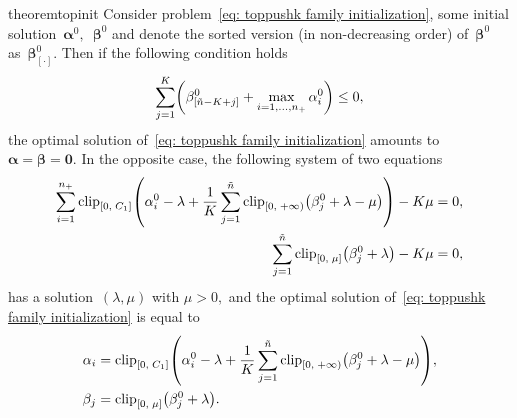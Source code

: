 \begin{restatable}{theorem}{topinit}\label{thm: toppushk family initialization}
  Consider problem~\eqref{eq: toppushk family initialization}, some initial solution~$\bm{\alpha}^0,$~$\bm{\beta}^0$ and denote the sorted version (in non-decreasing order) of~$\bm{\beta}^0$ as~$\bm{\beta}_{[\cdot]}^0.$ Then if the following condition holds
  \begin{equation}\label{eq:problem3_cond}
    \sum_{j = 1}^{K} \Brac{\beta_{[\ntil - K + j]}^0 + \max_{i = 1, \ldots, \npos} \alpha_i^0} \le 0,
  \end{equation}
  the optimal solution of~\eqref{eq: toppushk family initialization} amounts to~$\bm{\alpha} = \bm{\beta} = \bm{0}.$ In the opposite case, the following system of two equations
  \begin{subequations}\label{eq: toppushk family initialization}
    \begin{align}
      \sum_{i=1}^{\npos} \clip{0}{C_1}{ \alpha_i^0 - \lambda + \frac{1}{K} \sum_{j=1}^{\ntil} \clip[u]{0}{+\infty}{\beta_j^0 + \lambda - \mu}} - K \mu
      & = 0, \label{eq: toppushk family initialization 1} \\
      \sum_{j=1}^{\ntil} \clip{0}{\mu}{\beta_j^0 + \lambda} - K\mu
      & = 0, \label{eq: toppushk family initialization 2}
    \end{align}
  \end{subequations}
  has a solution~$(\lambda, \mu)$ with $\mu > 0,$ and the optimal solution of~\eqref{eq: toppushk family initialization} is equal to
  \begin{align*}
    \alpha_i
      & = \clip{0}{C_1}{\alpha_i^0 - \lambda + \frac{1}{K} \sum_{j=1}^{\ntil} \clip[u]{0}{+\infty}{\beta_j^0 + \lambda - \mu}}, \\
    \beta_j & = \clip{0}{\mu}{\beta_j^0 + \lambda}.
  \end{align*}
\end{restatable}

